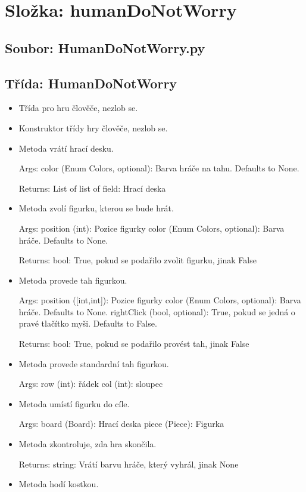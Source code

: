 \documentclass{article}
\begin{document}
\section*{Složka: humanDoNotWorry}
\subsection*{Soubor: HumanDoNotWorry.py}
\begin{itemize}
 \subsection*{Třída: HumanDoNotWorry}
\begin{itemize}
\item{Třída pro hru člověče, nezlob se.
    }
\item{Konstruktor třídy hry člověče, nezlob se.
        }
\item{Metoda vrátí hrací desku.

Args:
    color (Enum Colors, optional): Barva hráče na tahu. Defaults to None.

Returns:
    List of list of field: Hrací deska}
\item{Metoda zvolí figurku, kterou se bude hrát.

Args:
    position (int): Pozice figurky
    color (Enum Colors, optional): Barva hráče. Defaults to None.

Returns:
    bool: True, pokud se podařilo zvolit figurku, jinak False}
\item{Metoda provede tah figurkou.

Args:
    position ([int,int]): Pozice figurky
    color (Enum Colors, optional): Barva hráče. Defaults to None.
    rightClick (bool, optional): True, pokud se jedná o pravé tlačítko myši. Defaults to False.

Returns:
    bool: True, pokud se podařilo provést tah, jinak False}
\item{Metoda provede standardní tah figurkou.

Args:
    row (int): řádek
    col (int): sloupec}
\item{Metoda umístí figurku do cíle.

Args:
    board (Board): Hrací deska
    piece (Piece): Figurka}
\item{Metoda zkontroluje, zda hra skončila.

Returns:
    string: Vrátí barvu hráče, který vyhrál, jinak None}
\item{Metoda hodí kostkou.

}
\end{itemize}
\end{itemize}
\end{document}

